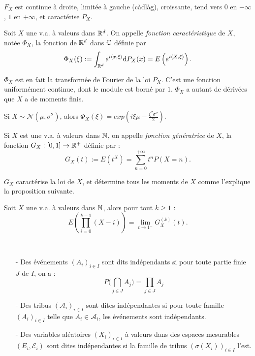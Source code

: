 \documentclass[11pt,a4paper]{article}
\begin{document}
\begin{rmq}
$F_X$ est continue à droite, limitée à gauche (càdlàg), croissante, tend vers $0$ en $-\infty$, $1$ en $+\infty$, et caractérise $P_X$.
\end{rmq}

\begin{definstar}
Soit $X$ une v.a. à valeurs dans $\mathbb R^d$. On appelle \textit{fonction caractéristique} de $X$, notée $\Phi_X$, la fonction de $\mathbb R^d$ dans $\mathbb C$ définie par \[\Phi_X(\xi) := \int_{\mathbb R^d} e^{i\left<x,\xi\right>}\mathrm{d}P_X(x) = E\left(e^{i\left<X,\xi\right>}\right).\]
\end{definstar}

\begin{rmq}
$\Phi_X$ est en fait la transformée de Fourier de la loi $P_X$. C'est une fonction uniformément continue, dont le module est borné par $1$. $\Phi_X$ a autant de dérivées que $X$ a de moments finis.
\end{rmq}

\begin{rmq}
Si $X\sim \mathcal{N}(\mu,\sigma^2)$, alors $\Phi_X(\xi)=exp(i\xi\mu - \frac{\xi^2\sigma^2}{2})$.
\end{rmq}

\begin{definstar}
Si $X$ est une v.a. à valeurs dans $\mathbb N$, on appelle \textit{fonction génératrice} de $X$, la fonction $G_X : [0,1] \to \mathbb R^+$ définie par : \[G_X(t) := E(t^X) = \sum_{n=0}^{+\infty} t^nP(X=n).\]
\end{definstar}

\begin{rmq}
$G_X$ caractérise la loi de $X$, et détermine tous les moments de $X$ comme l'explique la proposition suivante.
\end{rmq}

\begin{propstar}
Soit $X$ une v.a. à valeurs dans $\mathbb N$, alors pour tout $k\geq 1$ :\[E\left(\prod_{i=0}^{k-1}(X-i)\right) = \lim_{t\to 1^-}G_X^{(k)}(t).\]
\end{propstar}

\begin{definstar}[Indépendance]~
\begin{itemize}
\item[-] Des événements $(A_i)_{i\in I}$  sont dits indépendants si pour toute partie finie $J$ de $I$, on a : \[P\Big(\bigcap_{j\in J}A_j\Big)=\prod_{j\in J}A_j\]
\item[-] Des tribus  $(\mathcal{A}_i)_{i\in I}$  sont dites indépendantes si pour toute famille $(A_i)_{i\in I}$ telle que $A_i\in \mathcal{A}_i$, les événements sont indépendants.
\item[-] Des variables aléatoires $(X_i)_{i\in I}$  à valeurs dans des espaces mesurables $(E_i,\mathcal{E}_i)$ sont dites indépendantes si la famille de tribus $(\sigma(X_i))_{i\in I}$ l'est.
\end{itemize}
\end{definstar}
\end{document}
